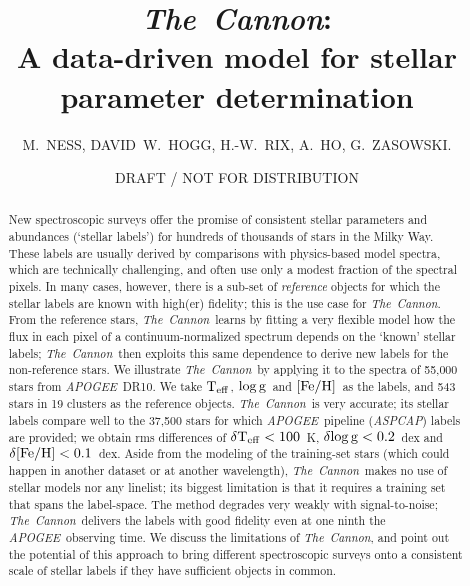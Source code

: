 \documentclass[12pt, preprint]{aastex}
\newcommand{\teff}{\mbox{$\rm T_{eff}$}}
\newcommand{\feh}{\mbox{$\rm [Fe/H]$}}
\newcommand{\logg}{\mbox{$\rm \log g$}}
\newcommand{\tc}{\textsl{The~Cannon}}
\newcommand{\apogee}{\textsl{APOGEE}}
\newcommand{\aspcap}{\textsl{ASPCAP}}
\begin{document}
\title{\tc:\\ A data-driven model for stellar parameter determination}
\author{M.~NESS,  
DAVID~W.~HOGG, 
H.-W.~RIX, 
A.~HO, 
G.~ZASOWSKI.}


   
\date{DRAFT / NOT FOR DISTRIBUTION}



\begin{abstract}%
New spectroscopic surveys offer the promise of consistent stellar
parameters and abundances (`stellar labels') for hundreds of thousands
of stars in the Milky Way. 
These labels are usually derived by comparisons with physics-based
model spectra, which are technically challenging, and often use only a
modest fraction of the spectral pixels. 
In many cases, however, there is a sub-set of \emph{reference}
objects for which the stellar labels are known with high(er)
fidelity; this is the use case for \tc.
From the reference stars, \tc\ learns by fitting a very flexible
model how the flux in each pixel of a continuum-normalized spectrum
depends on the `known' stellar labels; \tc\ then exploits this same
dependence to derive new labels for the non-reference stars.
We illustrate \tc\ by applying it to the spectra of 55,000 stars from
\apogee\ DR10. 
We take \teff, \logg\ and \feh\ as the labels, and 543 stars in 19
clusters as the reference objects. 
\tc\ is very accurate; its stellar labels compare well to the 37,500
stars for which \apogee\ pipeline (\aspcap) labels are provided; we
obtain rms differences of $\delta\teff< 100$~K, $\delta\logg< 0.2$~dex
and $\delta\feh< 0.1$~dex.
Aside from the modeling of the training-set stars (which could happen
in another dataset or at another wavelength), \tc\ makes no use of
stellar models nor any linelist; its biggest limitation is that it
requires a training set that spans the label-space. 
The method degrades very weakly with signal-to-noise; \tc\ delivers
the labels with good fidelity even at one ninth the
\apogee\ observing time. 
We discuss the limitations of \tc, and point out the potential of this
approach to bring different spectroscopic surveys onto a consistent
scale of stellar labels if they have sufficient objects in common.
\end{abstract}
\end{document}

